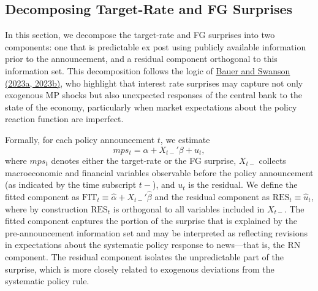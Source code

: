 \documentclass[12pt, reqno]{article}
\begin{document}
\subsection{Decomposing Target-Rate and FG Surprises}

In this section, we decompose the target-rate and FG surprises into two components: one that is predictable ex post using publicly available information prior to the announcement, and a residual component orthogonal to this information set. This decomposition follows the logic of \hyperlink{Bauer and Swanson (2023a, 2023b)}{Bauer and Swanson (2023a, 2023b)}, who highlight that interest rate surprises may capture not only exogenous MP shocks but also unexpected responses of the central bank to the state of the economy, particularly when market expectations about the policy reaction function are imperfect.

Formally, for each policy announcement $t$, we estimate
\begin{equation}
mps_t = \alpha + X_{t-}'\beta + u_t,
\end{equation}
where $mps_t$ denotes either the target-rate or the FG surprise, $X_{t-}$ collects macroeconomic and financial variables observable before the policy announcement (as indicated by the time subscript $t-$), and $u_t$ is the residual. We define the fitted component as $\text{FIT}_t \equiv \widehat{\alpha} + X_{t-}'\widehat{\beta}$ and the residual component as $\text{RES}_t \equiv \widehat{u}_t$, where by construction $\text{RES}_t$ is orthogonal to all variables included in $X_{t-}$. The fitted component captures the portion of the surprise that is explained by the pre-announcement information set and may be interpreted as reflecting revisions in expectations about the systematic policy response to news—that is, the RN component. The residual component isolates the unpredictable part of the surprise, which is more closely related to exogenous deviations from the systematic policy rule.
\end{document}
